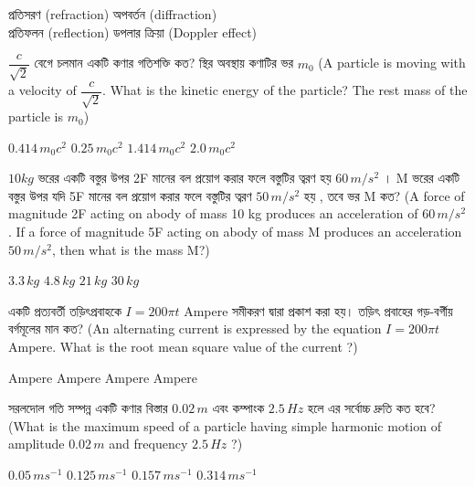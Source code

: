 \documentclass[addpoints]{exam}
\begin{document}
\begin{questions}
\begin{oneparchoices}
\choice  প্রতিসরণ (refraction)
\choice  অপবর্তন (diffraction)\\
\hspace*{-.33cm}\choice  প্রতিফলন (reflection)
\choice  ডপলার ক্রিয়া (Doppler effect)
\end{oneparchoices}

\question  $ \dfrac{c}{\sqrt{2}} $ বেগে চলমান একটি কণার গতিশক্তি কত? স্থির অবস্থায় কণাটির ভর $ m_{0} $ (A particle is moving with a velocity of $ \dfrac{c}{\sqrt{2}} $. What is the kinetic energy of the particle? The rest mass of the particle is $ m_{0} $)

\begin{oneparchoices}
\choice $ 0.414\,m_{0}c^{2} $
\choice $ 0.25\,m_{0}c^{2} $
\choice $ 1.414\,m_{0}c^{2} $
\choice $ 2.0\,m_{0}c^{2} $

\end{oneparchoices}

\question  $ 10kg $ ভরের একটি বস্তুর উপর 2F মানের বল প্রয়োগ করার ফলে বস্তুটির ত্বরণ হয় $ 60\,m/s^{2} $ । M ভরের একটি বস্তুর উপর যদি 5F মানের বল প্রয়োগ করার ফলে বস্তুটির ত্বরণ $ 50\,m/s^{2} $ হয় , তবে ভর M কত? (A force of magnitude 2F acting on abody of mass 10 kg produces an acceleration of $ 60\,m/s^{2} $. If a force of magnitude 5F acting on abody of mass M produces an acceleration $ 50\,m/s^{2} $, then what is the mass M?)

\begin{oneparchoices}
\choice $ 3.3\,kg $
\choice $ 4.8\,kg $
\choice $ 21\,kg $
\choice $ 30\,kg $

\end{oneparchoices}

\question  একটি প্রত্যবর্তী তড়িৎপ্রবাহকে $ I=200\pi t $ Ampere সমীকরণ দ্বারা প্রকাশ করা হয়। তড়িৎ প্রবাহের গড়-বর্গীয় বর্গমূলের মান কত? (An alternating current is expressed by the equation $ I=200\pi t $ Ampere. What is the root mean square value of the current ?)

\begin{oneparchoices}
 Ampere
 Ampere
 Ampere
 Ampere
\end{oneparchoices}


\question  সরলদোল গতি সম্পন্ন একটি কণার বিস্তার $ 0.02\,m $ এবং কম্পাংক $ 2.5\,Hz $ হলে এর সর্বোচ্চ দ্রুতি কত হবে? (What is the maximum speed of a particle having simple harmonic motion of amplitude $ 0.02\,m $ and frequency $ 2.5\,Hz $ ?)

\begin{oneparchoices}
\choice $ 0.05\,ms^{-1} $
\choice $ 0.125\,ms^{-1} $
\choice $ 0.157\,ms^{-1} $
\choice $ 0.314\,ms^{-1} $
\end{oneparchoices}


\end{questions}
\end{document}
